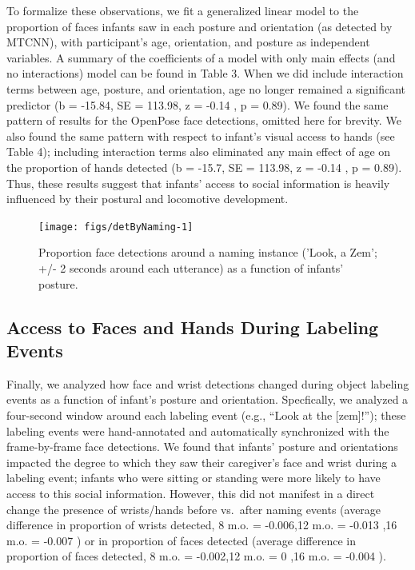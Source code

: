 \documentclass[10pt, letterpaper]{article}
\newenvironment{CodeChunk}{}{}
\begin{document}
To formalize these observations, we fit a generalized linear model to
the proportion of faces infants saw in each posture and orientation (as
detected by MTCNN), with participant's age, orientation, and posture as
independent variables. A summary of the coefficients of a model with
only main effects (and no interactions) model can be found in Table 3.
When we did include interaction terms between age, posture, and
orientation, age no longer remained a significant predictor (b = -15.84,
SE = 113.98, z = -0.14 , p = 0.89). We found the same pattern of results
for the OpenPose face detections, omitted here for brevity. We also
found the same pattern with respect to infant's visual access to hands
(see Table 4); including interaction terms also eliminated any main
effect of age on the proportion of hands detected (b = -15.7, SE =
113.98, z = -0.14 , p = 0.89). Thus, these results suggest that infants'
access to social information is heavily influenced by their postural and
locomotive development.

\begin{CodeChunk}
\begin{figure}[H]

{\centering \texttt{[image: figs/detByNaming-1]} 

}

\caption[Proportion face detections around a naming instance ('Look, a Zem']{Proportion face detections around a naming instance ('Look, a Zem'; +/- 2 seconds around each utterance) as a function of infants' posture.}\label{fig:detByNaming}
\end{figure}
\end{CodeChunk}

\subsection{Access to Faces and Hands During Labeling
Events}\label{access-to-faces-and-hands-during-labeling-events}

Finally, we analyzed how face and wrist detections changed during object
labeling events as a function of infant's posture and orientation.
Specfically, we analyzed a four-second window around each labeling event
(e.g., ``Look at the {[}zem{]}!''); these labeling events were
hand-annotated and automatically synchronized with the frame-by-frame
face detections. We found that infants' posture and orientations
impacted the degree to which they saw their caregiver's face and wrist
during a labeling event; infants who were sitting or standing were more
likely to have access to this social information. However, this did not
manifest in a direct change the presence of wrists/hands before
vs.~after naming events (average difference in proportion of wrists
detected, 8 m.o. = -0.006,12 m.o. = -0.013 ,16 m.o. = -0.007 ) or in
proportion of faces detected (average difference in proportion of faces
detected, 8 m.o. = -0.002,12 m.o. = 0 ,16 m.o. = -0.004 ).
\end{document}
